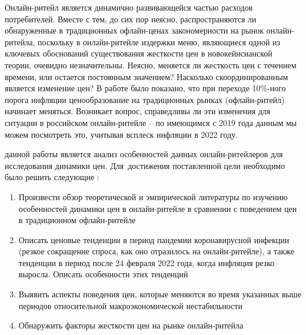 Онлайн-ритейл является динамично развивающейся частью расходов потребителей. Вместе с тем, до сих пор неясно, распространяются ли обнаруженные в традиционных офлайн-ценах закономерности на рынок онлайн-ритейла, поскольку в онлайн-ритейле издержки меню, являющиеся одной из ключевых обоснований существования жесткости цен в новокейнсианской теории, очевидно незначительны. Неясно, меняется ли жесткость цен с течением времени, или остается постоянным значением? Насколько скоординированным является изменение цен? В работе \cite{gagnon2009} было показано, что при переходе 10\%-ного порога инфляции ценообразование на традиционных рынках (офлайн-ритейл) начинает меняться. Возникает вопрос, справедливы ли эти изменения для ситуации в российском онлайн-ритейле – по имеющимся с 2019 года данным мы можем посмотреть это, учитывая всплеск инфляции в 2022 году.


{\aim} данной работы является анализ особенностей данных онлайн-ритейлеров для исследования динамики цен.
Для~достижения поставленной цели необходимо было решить следующие {\tasks}:
\begin{enumerate}[beginpenalty=10000] %
  \item Произвести обзор теоретической и эмпирической литературы по изучению особенностей динамики цен в онлайн-ритейле в сравнении с поведением цен в традиционном офлайн-ритейле
  \item Описать ценовые тенденции в период пандемии коронавирусной инфекции (резкое сокращение спроса, как оно отразилось на онлайн-ритейле), а также тенденции в период после 24 февраля 2022 года, когда инфляция резко выросла. Описать особенности этих тенденций
  \item Выявить аспекты поведения цен, которые меняются во время указанных выше периодов относительной макроэкономической нестабильности
  \item Обнаружить факторы жесткости цен на рынке онлайн-ритейла 
\end{enumerate}


